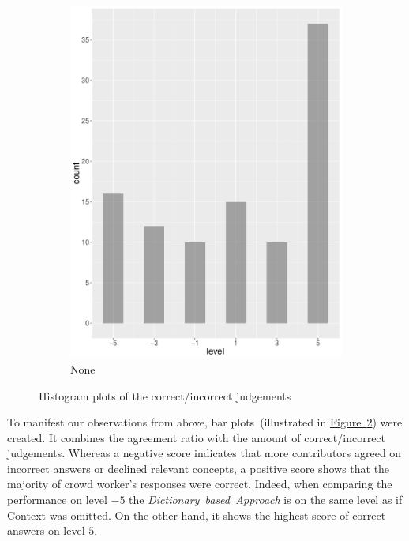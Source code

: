 \begin{figure}
\begin{subfigure}[b]{0.4\textwidth}
        \includegraphics[width=\textwidth]{plots/climate_change/hist_level_none}
        \caption{None}
        \label{fig:hist_level_climate_change_none}
    \end{subfigure}
    \caption{Histogram plots of the correct/incorrect judgements}\label{fig:hist_level_climate_change_all}
\end{figure}

To manifest our observations from above, bar plots~(illustrated in \hyperref[fig:hist_level_climate_change_all]{Figure~\ref*{fig:hist_level_climate_change_all}}) were created. It combines the agreement ratio with the amount of correct/incorrect judgements. Whereas a negative score indicates that more contributors agreed on incorrect answers or declined relevant concepts, a positive score shows that the majority of crowd worker's responses were correct. Indeed, when comparing the performance on level $-5$ the \emph{Dictionary~based~Approach} is on the same level as if Context was omitted. On the other hand, it shows the highest score of correct answers on level $5$.

